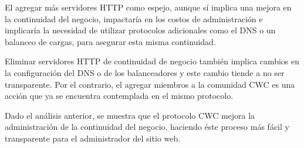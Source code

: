 El agregar más servidores HTTP como espejo, aunque sí implica una mejora en la continuidad del negocio, impactaría en los costos de administración e implicaría la necesidad de utilizar protocolos adicionales como el DNS o un balanceo de cargas, para asegurar esta misma continuidad. 

Eliminar servidores HTTP de continuidad de negocio también implica cambios en la configuración del DNS o de los balanceadores y este cambio tiende a no ser transparente. Por el contrario, el agregar miembros a la comunidad CWC es una acción que ya se encuentra contemplada en el mismo protocolo. 	

Dado el análisis anterior, se muestra que el protocolo CWC mejora la administración de la continuidad del negocio, haciendo éste proceso más fácil y transparente para el administrador del sitio web. 